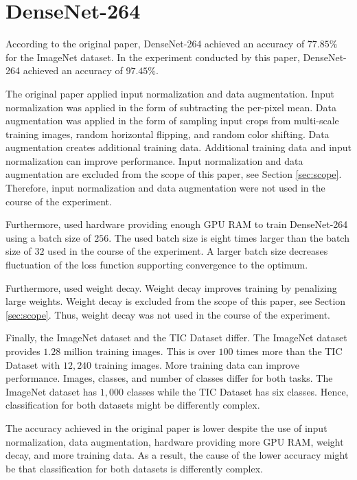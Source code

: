 \section{DenseNet-264}
According to the original paper, DenseNet-264 achieved an accuracy of $77.85 \%$ for the ImageNet dataset. \autocite{Huang.2017} In the experiment conducted by this paper, DenseNet-264 achieved an accuracy of $97.45 \%$.
\par
The original paper applied input normalization and data augmentation. Input normalization was applied in the form of subtracting the per-pixel mean. Data augmentation was applied in the form of sampling input crops from multi-scale training images, random horizontal flipping, and random color shifting. \autocite{Huang.2017}
Data augmentation creates additional training data. Additional training data and input normalization can improve performance. \autocite{ElAmir.2020} Input normalization and data augmentation are excluded from the scope of this paper, see Section \ref{sec:scope}. Therefore, input normalization and data augmentation were not used in the course of the experiment. 
\par
Furthermore, \cite{Huang.2017} used hardware providing enough GPU RAM to train DenseNet-264 using a batch size of $256$. The used batch size is eight times larger than the batch size of $32$ used in the course of the experiment. A larger batch size decreases fluctuation of the loss function supporting convergence to the optimum. \autocite{Ruder.2016}
\par
Furthermore, \cite{Huang.2017} used weight decay. Weight decay improves training by penalizing large weights. \autocite{ElAmir.2020} Weight decay is excluded from the scope of this paper, see Section \ref{sec:scope}. Thus, weight decay was not used in the course of the experiment. 
\par
Finally, the ImageNet dataset and the \ac{TIC Dataset} differ. The ImageNet dataset provides $1.28$ million training images. This is over $100$ times more than the \ac{TIC Dataset} with $12{,}240$ training images. \autocite{Huang.2017} More training data can improve performance. \autocite{ElAmir.2020} Images, classes, and number of classes differ for both tasks. The ImageNet dataset has $1{,}000$ classes while the \ac{TIC Dataset} has six classes. Hence, classification for both datasets might be differently complex.
\par
The accuracy achieved in the original paper is lower despite the use of input normalization, data augmentation, hardware providing more GPU RAM, weight decay, and more training data. As a result, the cause of the lower accuracy might be that classification for both datasets is differently complex.


